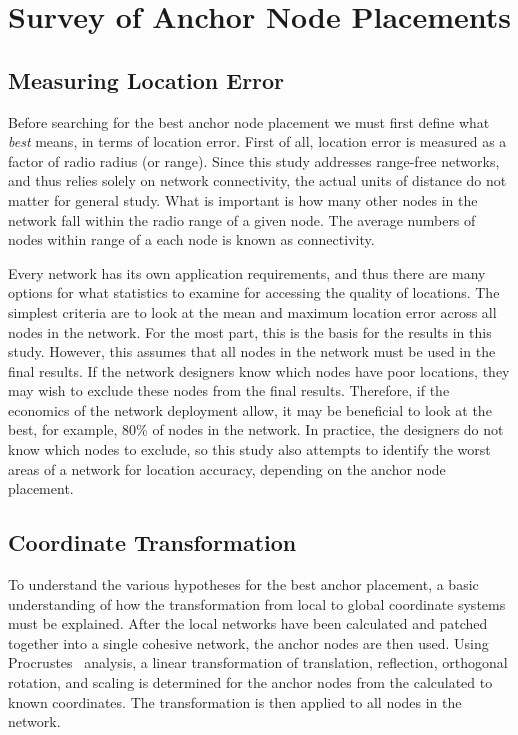 \chapter{Survey of Anchor Node Placements}

\section{Measuring Location Error}
Before searching for the best anchor node placement we must first define what \emph{best} means, in terms of location error.  First of all, location error is measured as a factor of radio radius (or range).  Since this study addresses range-free networks, and thus relies solely on network connectivity, the actual units of distance do not matter for general study.  What is important is how many other nodes in the network fall within the radio range of a given node.  The average numbers of nodes within range of a each node is known as connectivity.

Every network has its own application requirements, and thus there are many options for what statistics to examine for accessing the quality of locations.  The simplest criteria are to look at the mean and maximum location error across all nodes in the network.  For the most part, this is the basis for the results in this study.  However, this assumes that all nodes in the network must be used in the final results.  If the network designers know which nodes have poor locations, they may wish to exclude these nodes from the final results.  Therefore, if the economics of the network deployment allow, it may be beneficial to look at the best, for example, 80\% of nodes in the network.  In practice, the designers do not know which nodes to exclude, so this study also attempts to identify the worst areas of a network for location accuracy, depending on the anchor node placement.  

\section{Coordinate Transformation}
To understand the various hypotheses for the best anchor placement, a basic understanding of how the transformation from local to global coordinate systems must be explained.  After the local networks have been calculated and patched together into a single cohesive network, the anchor nodes are then used. Using Procrustes~\cite{procrustes-matlab} analysis, a linear transformation of translation, reflection, orthogonal rotation, and scaling is determined for the anchor nodes from the calculated to known coordinates.  The transformation is then applied to all nodes in the network.

